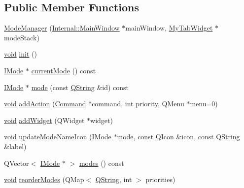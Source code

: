 \subsection*{\-Public \-Member \-Functions}
\begin{DoxyCompactItemize}
\item 
\hyperlink{group___core_plugin_ga7424a5232a9062d5d715d46cb6dab058}{\-Mode\-Manager} (\hyperlink{class_core_1_1_internal_1_1_main_window}{\-Internal\-::\-Main\-Window} $\ast$main\-Window, \hyperlink{class_my_tab_widget}{\-My\-Tab\-Widget} $\ast$mode\-Stack)
\item 
\hyperlink{group___u_a_v_objects_plugin_ga444cf2ff3f0ecbe028adce838d373f5c}{void} \hyperlink{group___core_plugin_ga0602e86f2b78e9b234c3fa737837d266}{init} ()
\item 
\hyperlink{class_core_1_1_i_mode}{\-I\-Mode} $\ast$ \hyperlink{group___core_plugin_ga8b622df4a78ae2e368474999c0698306}{current\-Mode} () const 
\item 
\hyperlink{class_core_1_1_i_mode}{\-I\-Mode} $\ast$ \hyperlink{group___core_plugin_ga2f29188b707a73ac13c2312497b99219}{mode} (const \hyperlink{group___u_a_v_objects_plugin_gab9d252f49c333c94a72f97ce3105a32d}{\-Q\-String} \&id) const 
\item 
\hyperlink{group___u_a_v_objects_plugin_ga444cf2ff3f0ecbe028adce838d373f5c}{void} \hyperlink{group___core_plugin_ga59c08a546248c7443d069fffc04a6b90}{add\-Action} (\hyperlink{class_core_1_1_command}{\-Command} $\ast$command, int priority, \-Q\-Menu $\ast$menu=0)
\item 
\hyperlink{group___u_a_v_objects_plugin_ga444cf2ff3f0ecbe028adce838d373f5c}{void} \hyperlink{group___core_plugin_ga44a336b5464c757765a238ac56da3cc3}{add\-Widget} (\-Q\-Widget $\ast$widget)
\item 
\hyperlink{group___u_a_v_objects_plugin_ga444cf2ff3f0ecbe028adce838d373f5c}{void} \hyperlink{group___core_plugin_ga19ea1eb5b0bc5b064afc7d4498a23b86}{update\-Mode\-Name\-Icon} (\hyperlink{class_core_1_1_i_mode}{\-I\-Mode} $\ast$\hyperlink{group___core_plugin_ga2f29188b707a73ac13c2312497b99219}{mode}, const \-Q\-Icon \&icon, const \hyperlink{group___u_a_v_objects_plugin_gab9d252f49c333c94a72f97ce3105a32d}{\-Q\-String} \&label)
\item 
\-Q\-Vector$<$ \hyperlink{class_core_1_1_i_mode}{\-I\-Mode} $\ast$ $>$ \hyperlink{group___core_plugin_gafe066d728cdaeffc19eb6407a41e29e0}{modes} () const 
\item 
\hyperlink{group___u_a_v_objects_plugin_ga444cf2ff3f0ecbe028adce838d373f5c}{void} \hyperlink{group___core_plugin_ga5d0135f443bbd69ffdc3cf24152cf9a0}{reorder\-Modes} (\-Q\-Map$<$ \hyperlink{group___u_a_v_objects_plugin_gab9d252f49c333c94a72f97ce3105a32d}{\-Q\-String}, int $>$ priorities)
\end{DoxyCompactItemize}
